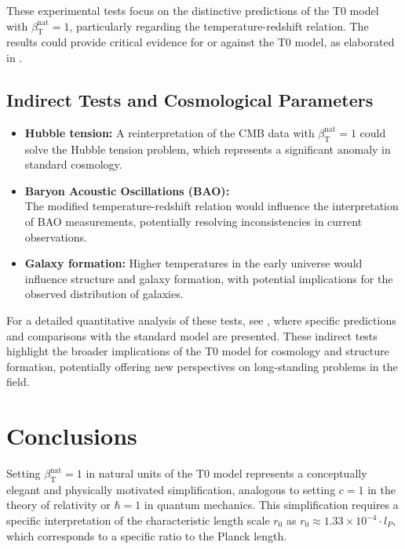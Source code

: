 \documentclass[12pt,a4paper]{article}
\newcommand{\betaT}{\beta_{\text{T}}}
\begin{document}
	These experimental tests focus on the distinctive predictions of the T0 model with \(\betaT^{\text{nat}} = 1\), particularly regarding the temperature-redshift relation. The results could provide critical evidence for or against the T0 model, as elaborated in \cite{pascher_messdifferenzen_2025}.
	
	\subsection{Indirect Tests and Cosmological Parameters}
	\label{subsec:indirect_tests}
	
	\begin{itemize}
		\item \textbf{Hubble tension:} A reinterpretation of the CMB data with \(\betaT^{\text{nat}} = 1\) could solve the Hubble tension problem, which represents a significant anomaly in standard cosmology.
		\item \textbf{Baryon Acoustic Oscillations (BAO):} \\The modified temperature-redshift relation would influence the interpretation of BAO measurements, potentially resolving inconsistencies in current observations.
		\item \textbf{Galaxy formation:} Higher temperatures in the early universe would influence structure and galaxy formation, with potential implications for the observed distribution of galaxies.
	\end{itemize}
	
	For a detailed quantitative analysis of these tests, see \cite{pascher_alphabeta_2025}, where specific predictions and comparisons with the standard model are presented. These indirect tests highlight the broader implications of the T0 model for cosmology and structure formation, potentially offering new perspectives on long-standing problems in the field.
	
	\section{Conclusions}
	\label{sec:conclusions}
	
	Setting \(\betaT^{\text{nat}} = 1\) in natural units of the T0 model represents a conceptually elegant and physically motivated simplification, analogous to setting \(c = 1\) in the theory of relativity or \(\hbar = 1\) in quantum mechanics. This simplification requires a specific interpretation of the characteristic length scale \(r_0\) as \(r_0 \approx 1.33 \times 10^{-4} \cdot l_P\), which corresponds to a specific ratio to the Planck length.
	
\end{document}
